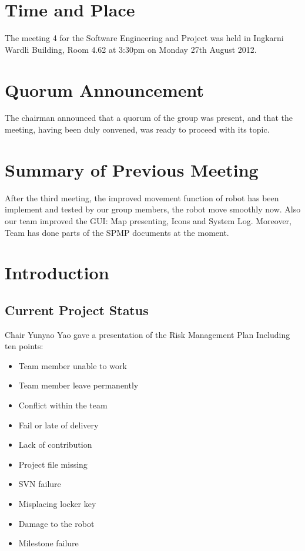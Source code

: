 \documentclass[11pt, a4paper]{article}
\begin{document}
\section{Time and Place}
The meeting 4 for the Software Engineering and Project was held in Ingkarni Wardli Building, Room 4.62 at 3:30pm on Monday 27th August 2012.

\section{Quorum Announcement}
The chairman announced that a quorum of the group was present, and that the meeting, having been duly convened, was ready to proceed with its topic.

\section{Summary of Previous Meeting}
After the third meeting, the improved movement function of robot has been implement and tested by our group members, the robot move smoothly now. Also our team improved the GUI: Map presenting, Icons and System Log. Moreover, Team has done parts of the SPMP documents at the moment.


\section{Introduction}

\subsection{Current Project Status}
Chair  Yunyao Yao gave a presentation of the Risk Management Plan Including ten points:
\begin{itemize} 
\item Team member unable to work
\item Team member leave permanently 
\item Conflict within the team
\item Fail or late of delivery
\item Lack of contribution
\item Project file missing
\item SVN failure
\item Misplacing locker key
\item Damage to the robot
\item Milestone failure
\end{itemize}
\end{document}
